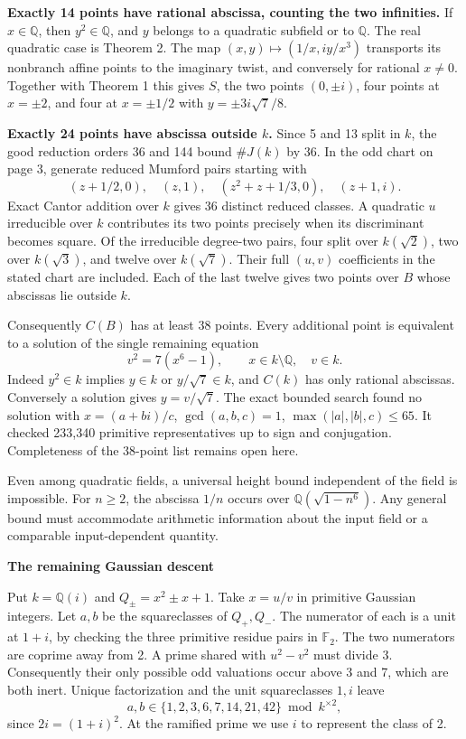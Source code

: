 \documentclass[12pt]{article}
\newcommand{\Q}{\mathbb Q}\newcommand{\Z}{\mathbb Z}
\newcommand{\head}[1]{{\Large\bfseries\color{ink}#1}\par\vspace{3pt}}
\begin{document}
\textbf{Exactly 14 points have rational abscissa, counting the two infinities.} If $x\in\Q$, then $y^2\in\Q$, and $y$ belongs to a quadratic subfield or to $\Q$. The real quadratic case is Theorem 2. The map $(x,y)\mapsto(1/x,iy/x^3)$ transports its nonbranch affine points to the imaginary twist, and conversely for rational $x\ne0$. Together with Theorem 1 this gives $S$, the two points $(0,\pm i)$, four points at $x=\pm2$, and four at $x=\pm1/2$ with $y=\pm3i\sqrt7/8$.

\textbf{Exactly 24 points have abscissa outside $k$.} Since 5 and 13 split in $k$, the good reduction orders 36 and 144 bound $\#J(k)$ by 36. In the odd chart on page 3, generate reduced Mumford pairs starting with
\[
 (z+1/2,0),\quad(z,1),\quad(z^2+z+1/3,0),\quad(z+1,i).
\]
Exact Cantor addition over $k$ gives 36 distinct reduced classes. A quadratic $u$ irreducible over $k$ contributes its two points precisely when its discriminant becomes square. Of the irreducible degree-two pairs, four split over $k(\sqrt2)$, two over $k(\sqrt3)$, and twelve over $k(\sqrt7)$. Their full $(u,v)$ coefficients in the stated chart are included. Each of the last twelve gives two points over $B$ whose abscissas lie outside $k$.

Consequently $C(B)$ has at least 38 points. Every additional point is equivalent to a solution of the single remaining equation
\[
 v^2=7(x^6-1),\qquad x\in k\setminus\Q,\quad v\in k .
\]
Indeed $y^2\in k$ implies $y\in k$ or $y/\sqrt7\in k$, and $C(k)$ has only rational abscissas. Conversely a solution gives $y=v/\sqrt7$. The exact bounded search found no solution with $x=(a+bi)/c$, $\gcd(a,b,c)=1$, $\max(|a|,|b|,c)\le65$. It checked 233,340 primitive representatives up to sign and conjugation. Completeness of the 38-point list remains open here.

Even among quadratic fields, a universal height bound independent of the field is impossible. For $n\ge2$, the abscissa $1/n$ occurs over $\Q(\sqrt{1-n^6})$. Any general bound must accommodate arithmetic information about the input field or a comparable input-dependent quantity.

\newpage
\head{The remaining Gaussian descent}
Put $k=\Q(i)$ and $Q_{\pm}=x^2\pm x+1$. Take $x=u/v$ in primitive Gaussian integers. Let $a,b$ be the squareclasses of $Q_+,Q_-$. The numerator of each is a unit at $1+i$, by checking the three primitive residue pairs in $\mathbb F_2$. The two numerators are coprime away from 2. A prime shared with $u^2-v^2$ must divide 3. Consequently their only possible odd valuations occur above 3 and 7, which are both inert. Unique factorization and the unit squareclasses $1,i$ leave
\[
         a,b\in\{1,2,3,6,7,14,21,42\}\bmod k^{\times 2},
\]
since $2i=(1+i)^2$. At the ramified prime we use $i$ to represent the class of 2.
\end{document}

